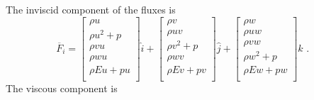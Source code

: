 The inviscid component of the fluxes is
\begin{equation}
 \overline{F}_{i} = \left [ \begin{array}{c}
                               \rho u \\
                               \rho u^{2} + p \\
                               \rho vu \\
                               \rho wu \\
                               \rho Eu + pu \\
                            \end{array} \right ] \hat{i} 
                  + \left [ \begin{array}{c} 
                               \rho v \\
                               \rho uv \\
                               \rho v^{2} + p \\
                               \rho wv \\
                               \rho Ev + pv  \\
                            \end{array} \right ] \hat{j} 
                  + \left [ \begin{array}{c} 
                               \rho w \\
                               \rho uw \\
                               \rho vw \\
                               \rho w^{2} + p \\
                               \rho Ew + pw \\
                            \end{array} \right ] \hat{k} 
                 \text{ . }
 \label{eq:F_i_3D}
\end{equation}
The viscous component is
